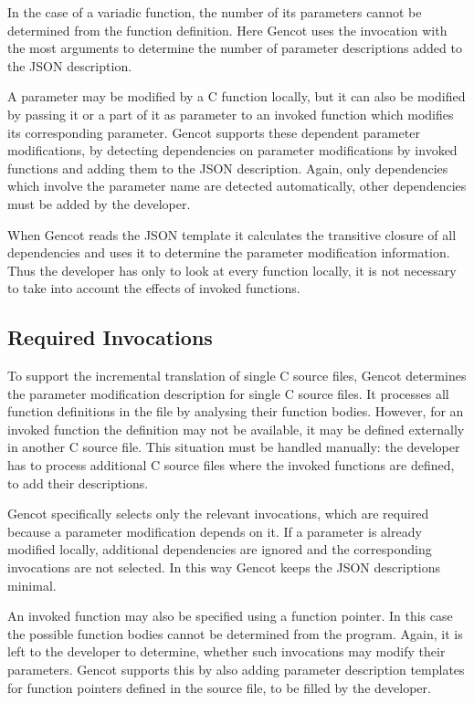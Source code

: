 In the case of a variadic function, the number of its parameters cannot be determined from the function definition.
Here Gencot uses the invocation with the most arguments to determine the number of parameter descriptions added
to the JSON description.

A parameter may be modified by a C function locally, but it can 
also be modified by passing it or a part of it as parameter to an invoked function which modifies its corresponding
parameter. Gencot supports these dependent parameter modifications, by detecting dependencies on parameter
modifications by invoked functions and adding them to the JSON description. Again, only dependencies which
involve the parameter name are detected automatically, other dependencies must be added by the developer.

When Gencot reads the JSON template it calculates the transitive closure of all dependencies and uses it to
determine the parameter modification information. Thus the developer has only to look at every function locally,
it is not necessary to take into account the effects of invoked functions.

\subsection{Required Invocations}

To support the incremental translation of single C source files, Gencot determines the parameter modification
description for single C source files. It processes all function definitions in the file by analysing their 
function bodies. However, for an invoked function the definition may not be available, it may be defined externally
in another C source file. This situation must be handled manually: the developer has to process additional
C source files where the invoked functions are defined, to add their descriptions.

Gencot specifically selects only the relevant invocations, which are required because a parameter modification depends on it.
If a parameter is already modified locally, additional dependencies are ignored and the corresponding invocations
are not selected. In this way Gencot keeps the JSON descriptions minimal.

An invoked function may also be specified using a function pointer. In this case the possible function bodies cannot 
be determined from the program. Again, it is left to the developer to determine, whether such invocations may modify
their parameters. Gencot supports this by also adding parameter description templates for function pointers defined in the 
source file, to be filled by the developer. 

